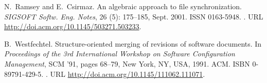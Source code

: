\documentclass{sigplanconf}
\theoremstyle{plain}
\begin{document}
\begin{thebibliography}{22}
N.~Ramsey and E.~Csirmaz.
\newblock An algebraic approach to file synchronization.
\newblock \emph{SIGSOFT Softw. Eng. Notes}, 26 (5): 175--185,
  Sept. 2001.
\newblock ISSN 0163-5948.
\newblock {}.
\newblock URL \url{http://doi.acm.org/10.1145/503271.503233}.

B.~Westfechtel.
\newblock Structure-oriented merging of revisions of software documents.
\newblock In \emph{Proceedings of the 3rd International Workshop on Software
  Configuration Management}, SCM '91, pages 68--79, New York, NY, USA, 1991.
  ACM.
\newblock ISBN 0-89791-429-5.
\newblock {}.
\newblock URL \url{http://doi.acm.org/10.1145/111062.111071}.

\end{thebibliography}



%



\end{document}
